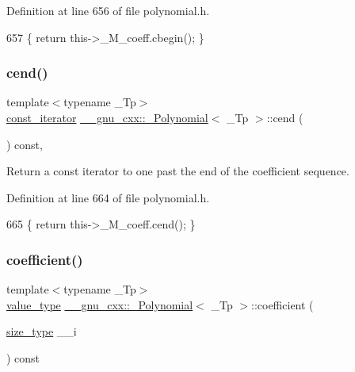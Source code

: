 Definition at line 656 of file polynomial.\+h.


\begin{DoxyCode}
657       \{ \textcolor{keywordflow}{return} this->\_M\_coeff.cbegin(); \}
\end{DoxyCode}
\mbox{\label{class____gnu__cxx_1_1__Polynomial_ae3d5b393866c55f9585a1e0e10c41cc4}} 
\subsubsection{\texorpdfstring{cend()}{cend()}}
{\footnotesize\ttfamily template$<$typename \+\_\+\+Tp$>$ \\
\hyperlink{class____gnu__cxx_1_1__Polynomial_a96e4523cc2a834724fe4224f0800486b}{const\+\_\+iterator} \hyperlink{class____gnu__cxx_1_1__Polynomial}{\+\_\+\+\_\+gnu\+\_\+cxx\+::\+\_\+\+Polynomial}$<$ \+\_\+\+Tp $>$\+::cend (\begin{DoxyParamCaption}{ }\end{DoxyParamCaption}) const\hspace{0.3cm}{\ttfamily [inline]}, {\ttfamily [noexcept]}}

Return a {\ttfamily const} iterator to one past the end of the coefficient sequence. 

Definition at line 664 of file polynomial.\+h.


\begin{DoxyCode}
665       \{ \textcolor{keywordflow}{return} this->\_M\_coeff.cend(); \}
\end{DoxyCode}
\mbox{\label{class____gnu__cxx_1_1__Polynomial_a7cee31b3acbe8c024af6d696bc610f49}} 
\subsubsection{\texorpdfstring{coefficient()}{coefficient()}\hspace{0.1cm}{\footnotesize\ttfamily [1/2]}}
{\footnotesize\ttfamily template$<$typename \+\_\+\+Tp$>$ \\
\hyperlink{class____gnu__cxx_1_1__Polynomial_a725563351f50e76084a7a016c06f8a53}{value\+\_\+type} \hyperlink{class____gnu__cxx_1_1__Polynomial}{\+\_\+\+\_\+gnu\+\_\+cxx\+::\+\_\+\+Polynomial}$<$ \+\_\+\+Tp $>$\+::coefficient (\begin{DoxyParamCaption}\item[{\hyperlink{class____gnu__cxx_1_1__Polynomial_a6afe219c123c7a2fdc5abac8a6639053}{size\+\_\+type}}]{\+\_\+\+\_\+i }\end{DoxyParamCaption}) const\hspace{0.3cm}{\ttfamily [inline]}}

